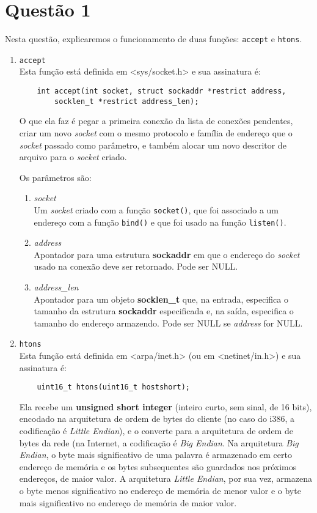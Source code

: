 \documentclass[a4paper,10pt]{article}
\begin{document}
\section{Questão 1}
Nesta questão, explicaremos o funcionamento de duas funções: {\tt accept} e {\tt htons}.
\begin{enumerate}
\item {\tt accept}\\
    Esta função está definida em <sys/socket.h> e sua assinatura é:
    \begin{lstlisting}
    int accept(int socket, struct sockaddr *restrict address,
        socklen_t *restrict address_len);
    \end{lstlisting}
    O que ela faz é pegar a primeira conexão da lista de conexões pendentes, criar um novo \textit{socket} com o mesmo protocolo e família de endereço que o \textit{socket} passado como parâmetro, e também alocar um novo descritor de arquivo para o \textit{socket} criado.
    
    Os parâmetros são:
    \begin{enumerate}
        \item \textit{socket}\\
        Um \textit{socket} criado com a função {\tt socket()}, que foi associado a um endereço com a função {\tt bind()} e que foi usado na função {\tt listen()}.
        \item \textit{address}\\
        Apontador para uma estrutura \textbf{sockaddr} em que o endereço do \textit{socket} usado na conexão deve ser retornado. Pode ser NULL.
        \item \textit{address\_len}\\
        Apontador para um objeto \textbf{socklen\_t} que, na entrada, especifica o tamanho da estrutura \textbf{sockaddr} especificada e, na saída, especifica o tamanho do endereço armazendo. Pode ser NULL se \textit{address} for NULL.
    \end{enumerate}
\item {\tt htons}\\
    Esta função está definida em <arpa/inet.h> (ou em <netinet/in.h>) e sua assinatura é:
    \begin{lstlisting}
    uint16_t htons(uint16_t hostshort);
    \end{lstlisting}
    Ela recebe um \textbf{unsigned short integer} (inteiro curto, sem sinal, de 16 bits), encodado na arquitetura de ordem de bytes do cliente (no caso do i386, a codificação é \textit{Little Endian}), e o converte para a arquitetura de ordem de bytes da rede (na Internet, a codificação é \textit{Big Endian}. Na arquitetura \textit{Big Endian}, o byte mais significativo de uma palavra é armazenado em certo endereço de memória e os bytes subsequentes são guardados nos próximos endereços, de maior valor. A arquitetura \textit{Little Endian}, por sua vez, armazena o byte menos significativo no endereço de memória de menor valor e o byte mais significativo no endereço de memória de maior valor.
\end{enumerate}
\end{document}
